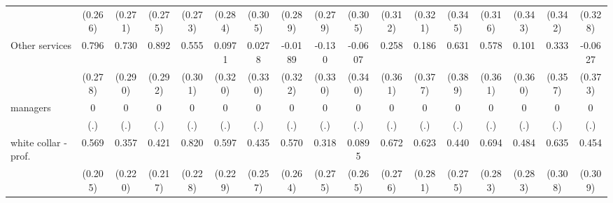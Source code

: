 {\begin{tabular}{l*{16}{c}}
                    &     (0.266)         &     (0.271)         &     (0.275)         &     (0.273)         &     (0.284)         &     (0.305)         &     (0.289)         &     (0.279)         &     (0.305)         &     (0.312)         &     (0.321)         &     (0.345)         &     (0.316)         &     (0.343)         &     (0.342)         &     (0.328)         \\
[1em]
Other services      &       0.796\sym{**} &       0.730\sym{*}  &       0.892\sym{**} &       0.555         &      0.0971         &      0.0278         &     -0.0189         &      -0.130         &     -0.0607         &       0.258         &       0.186         &       0.631         &       0.578         &       0.101         &       0.333         &     -0.0627         \\
                    &     (0.278)         &     (0.290)         &     (0.292)         &     (0.301)         &     (0.320)         &     (0.330)         &     (0.322)         &     (0.330)         &     (0.340)         &     (0.361)         &     (0.377)         &     (0.389)         &     (0.361)         &     (0.360)         &     (0.357)         &     (0.373)         \\
[1em]
managers            &           0         &           0         &           0         &           0         &           0         &           0         &           0         &           0         &           0         &           0         &           0         &           0         &           0         &           0         &           0         &           0         \\
                    &         (.)         &         (.)         &         (.)         &         (.)         &         (.)         &         (.)         &         (.)         &         (.)         &         (.)         &         (.)         &         (.)         &         (.)         &         (.)         &         (.)         &         (.)         &         (.)         \\
[1em]
white collar - prof.&       0.569\sym{**} &       0.357         &       0.421         &       0.820\sym{***}&       0.597\sym{**} &       0.435         &       0.570\sym{*}  &       0.318         &      0.0895         &       0.672\sym{*}  &       0.623\sym{*}  &       0.440         &       0.694\sym{*}  &       0.484         &       0.635\sym{*}  &       0.454         \\
                    &     (0.205)         &     (0.220)         &     (0.217)         &     (0.228)         &     (0.229)         &     (0.257)         &     (0.264)         &     (0.275)         &     (0.265)         &     (0.276)         &     (0.281)         &     (0.275)         &     (0.283)         &     (0.283)         &     (0.308)         &     (0.309)         \\

\end{tabular}}
